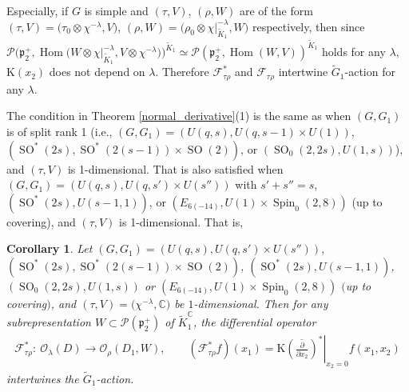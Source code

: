 \documentclass[pdftex]{sigma}
\numberwithin{equation}{section}
\newtheorem{Corollary}[Theorem]{Corollary}
\newcommand{\BC}{\mathbb{C}}
\newcommand{\fp}{\mathfrak{p}}
\newcommand{\cF}{\mathcal{F}}
\newcommand{\cO}{\mathcal{O}}
\newcommand{\cP}{\mathcal{P}}
\newcommand{\rK}{\mathrm{K}}
\newcommand{\Hom}{\operatorname{Hom}}
\begin{document}
Especially, if $G$ is simple and $(\tau,V)$, $(\rho,W)$ are of the form $(\tau,V)=\big(\tau_0\otimes\chi^{-\lambda},V\big)$,
$(\rho,W)=\big(\rho_0\otimes\chi|_{\tilde{K}_1}^{-\lambda}{,}W\big)$ respectively, then since
$\cP\big(\fp^+_2{,}\Hom\big(W\otimes\chi|_{\tilde{K}_1}^{-\lambda}{,}V\otimes\chi^{-\lambda}\big)\big)^{\tilde{K}_1}
\!\simeq\!\cP(\fp^+_2{,}\Hom(W,V))^{\tilde{K}_1}$ holds for any $\lambda$, $\rK(x_2)$ does not depend on $\lambda$.
Therefore $\cF_{\tau\rho}^*$ and $\cF_{\tau\rho}$ intertwine $\tilde{G}_1$-action for any $\lambda$.

The condition in Theorem \ref{normal_derivative}(1) is the same as \cite[Lemma 5.5(3)]{KP2} when $(G,G_1)$ is of split rank 1
(i.e., $(G,G_1)=(U(q,s),U(q,s-1)\times U(1))$, $(\operatorname{SO}^*(2s),\operatorname{SO}^*(2(s-1))\times \operatorname{SO}(2))$, or $(\operatorname{SO}_0(2,2s),U(1,s))$),
and $(\tau,V)$ is 1-dimensional.
That is also satisfied when $(G,G_1)=(U(q,s),U(q,s')\times U(s''))$ with $s'+s''=s$, $(\operatorname{SO}^*(2s),U(s-1,1))$,
or $(E_{6(-14)},U(1)\times \operatorname{Spin}_0(2,8))$ (up to covering), and $(\tau,V)$ is 1-dimensional. That is,
\begin{Corollary}\label{normal_der_1}
Let $(G,G_1)=(U(q,s),U(q,s')\times U(s''))$, $(\operatorname{SO}^*(2s),\operatorname{SO}^*(2(s-1))\times \operatorname{SO}(2))$, $(\operatorname{SO}^*(2s),U(s-1,1))$, $(\operatorname{SO}_0(2,2s),U(1,s))$
or $(E_{6(-14)},U(1)\times \operatorname{Spin}_0(2,8))$ $($up to covering$)$, and $(\tau,V)=\big(\chi^{-\lambda},\BC\big)$ be $1$-dimensional.
Then for any subrepresentation $W\subset\cP(\fp^+_2)$ of $\tilde{K}^\BC_1$, the differential operator
\begin{gather*}
\cF_{\tau\rho}^*\colon \ \cO_\lambda(D)\to\cO_\rho(D_1,W), \qquad
(\cF_{\tau\rho}^*f)(x_1)=\rK\left.\left(\overline{\frac{\partial}{\partial x_2}}\right)^*\right|_{x_2=0}f(x_1,x_2)
\end{gather*}
intertwines the $\tilde{G}_1$-action.
\end{Corollary}
\end{document}
